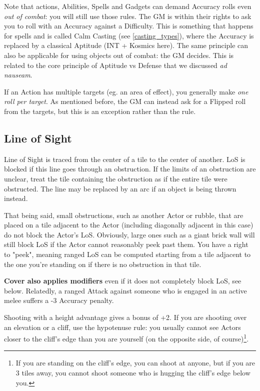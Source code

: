 Note that actions, Abilities, Spells and Gadgets can demand Accuracy rolls even \textit{out of combat}: you will still use those rules. The GM is within their rights to ask you to roll with an Accuracy against a Difficulty. This is something that happens for spells and is called Calm Casting (see \ref{casting_types}), where the Accuracy is replaced by a classical Aptitude (INT + Kosmics here). The same principle can also be applicable for using objects out of combat: the GM decides. This is related to the core principle of Aptitude vs Defense that we discussed \textit{ad nauseam}.

If an Action has multiple targets (eg. an area of effect), you generally make \textit{one roll per target}. As mentioned before, the GM can instead ask for a Flipped roll from the targets, but this is an exception rather than the rule. 


\subsection{Line of Sight}

Line of Sight is traced from the center of a tile to the center of another. LoS is blocked if this line goes through an obstruction. If the limits of an obstruction are unclear, treat the tile containing the obstruction as if the entire tile were obstructed. The line may be replaced by an arc if an object is being thrown instead. 

That being said, small obstructions, such as another Actor or rubble, that are placed on a tile adjacent to the Actor (including diagonally adjacent in this case) do not block the Actor's LoS. Obviously, large ones such as a giant brick wall will still block LoS if the Actor cannot reasonably peek past them. You have a right to "peek", meaning ranged LoS can be computed starting from a tile adjacent to the one you're standing on if there is no obstruction in that tile. 

\textbf{Cover also applies modifiers} even if it does not completely block LoS, see below. Relatedly, a ranged Attack against someone who is engaged in an active melee suffers a -3 Accuracy penalty.

Shooting with a height advantage gives a bonus of +2. If you are shooting over an elevation or a cliff, use the hypotenuse rule: you usually cannot see Actors closer to the cliff's edge than you are yourself (on the opposite side, of course)\footnote{If you are standing on the cliff's edge, you can shoot at anyone, but if you are 3 tiles away, you cannot shoot someone who is hugging the cliff's edge below you.}. 

